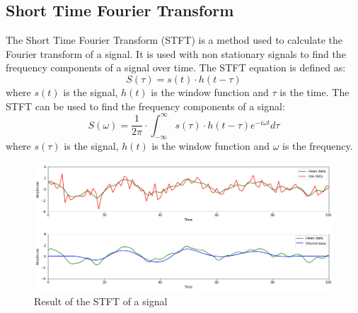 \documentclass[a4paper]{sapthesis}
\begin{document}
\subsection{Short Time Fourier Transform}\label{sec:stft}
The Short Time Fourier Transform (STFT)\cite{stft}\cite{stft2}
is a method used to calculate the
Fourier transform of a signal. It is used with non stationary signals
to find the frequency components of a signal over time.
The STFT equation is defined as:
\begin{equation}
\label{eq:stft}
S(\tau) = s(t) \cdot h(t-\tau)
\end{equation}
where $s(t)$ is the signal, $h(t)$ is the window function and $\tau$ is
the time. \newline
The STFT can be used to find the frequency components of a signal:
\begin{equation}
\label{eq:stft2}
S(\omega)= \frac{1}{2\pi}\cdot \int_{-\infty}^{\infty} s(\tau) \cdot h(t-\tau) e^{-i\omega t} d\tau
\end{equation}
where $s(\tau)$ is the signal, $h(t)$ is the window function and $\omega$
is the frequency. \newline
\begin{figure}[h]
  \includegraphics[scale=0.45]{stft_waves_result}
  \centering
  \caption{Result of the STFT of a signal
  }\label{fig:stft} 
  \end{figure}
\end{document}

